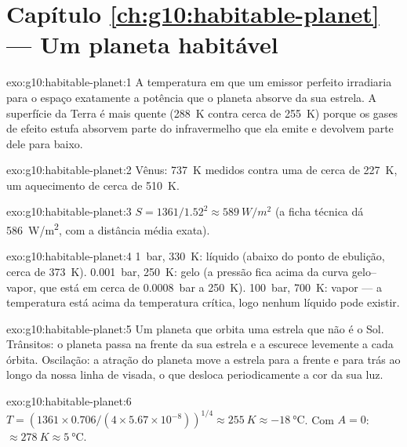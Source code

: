 \section*{Capítulo \ref{ch:g10:habitable-planet} --- Um planeta habitável}

\begin{solution}{exo:g10:habitable-planet:1}
A temperatura em que um emissor perfeito irradiaria para o espaço
exatamente a potência que o planeta absorve da sua estrela. A superfície da
Terra é mais quente (\qty{288}{K} contra cerca de \qty{255}{K}) porque os
gases de efeito estufa absorvem parte do infravermelho que ela emite e
devolvem parte dele para baixo.
\end{solution}

\begin{solution}{exo:g10:habitable-planet:2}
Vênus: \qty{737}{K} medidos contra uma  de cerca de
\qty{227}{K}, um aquecimento de cerca de \qty{510}{K}.
\end{solution}

\begin{solution}{exo:g10:habitable-planet:3}
$S = 1361/1.52^2 \approx \qty{589}{W/m^2}$ (a ficha técnica dá
\qty{586}{W/m^2}, com a distância média exata).
\end{solution}

\begin{solution}{exo:g10:habitable-planet:4}
\qty{1}{bar}, \qty{330}{K}: líquido (abaixo do ponto de ebulição, cerca de
\qty{373}{K}). \qty{0.001}{bar}, \qty{250}{K}: gelo (a pressão fica acima
da curva gelo--vapor, que está em cerca de \qty{0.0008}{bar} a
\qty{250}{K}). \qty{100}{bar}, \qty{700}{K}: vapor --- a temperatura está
acima da temperatura crítica, logo nenhum líquido pode existir.
\end{solution}

\begin{solution}{exo:g10:habitable-planet:5}
Um planeta que orbita uma estrela que não é o Sol. Trânsitos: o planeta
passa na frente da sua estrela e a escurece levemente a cada órbita.
Oscilação: a atração do planeta move a estrela para a frente e para trás ao
longo da nossa linha de visada, o que desloca periodicamente a cor da sua
luz.
\end{solution}

\begin{solution}{exo:g10:habitable-planet:6}
$T = (1361 \times 0.706/(4 \times 5.67\times10^{-8}))^{1/4} \approx
\qty{255}{K} \approx \qty{-18}{\degreeCelsius}$. Com $A = 0$:
$\approx \qty{278}{K} \approx \qty{5}{\degreeCelsius}$.
\end{solution}

